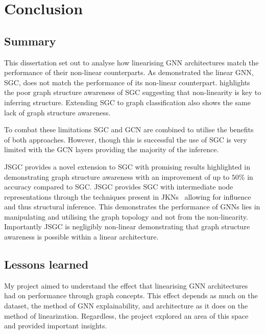 \chapter{Conclusion}

\section{Summary}
This dissertation set out to analyse how linearising GNN architectures match the performance of their non-linear counterparts.
As  demonstrated the linear GNN, SGC, does not match the performance of its non-linear counterpart.
 highlights the poor graph structure awareness of SGC suggesting that non-linearity is key to inferring structure.
Extending SGC to graph classification also shows the same lack of graph structure awareness.

To combat these limitations SGC and GCN are combined to utilise the benefits of both approaches.
However, though this is successful the use of SGC is very limited with the GCN layers providing the majority of the inference.

JSGC provides a novel extension to SGC with promising results highlighted in  demonstrating graph structure awareness with an improvement of up to $50\%$ in accuracy compared to SGC.
JSGC provides SGC with intermediate node representations through the techniques present in JKNs~\cite{xu2018representation} allowing for influence and thus structural inference.
This demonstrates the performance of GNNs lies in manipulating and utilising the graph topology and not from the non-linearity.
Importantly JSGC is negligibly non-linear demonstrating that graph structure awareness is possible within a linear architecture.

\section{Lessons learned}
My project aimed to understand the effect that linearising GNN architectures had on performance through graph concepts.
This effect depends as much on the dataset, the method of GNN explainability, and architecture as it does on the method of linearization.
Regardless, the project explored an area of this space and provided important insights.

